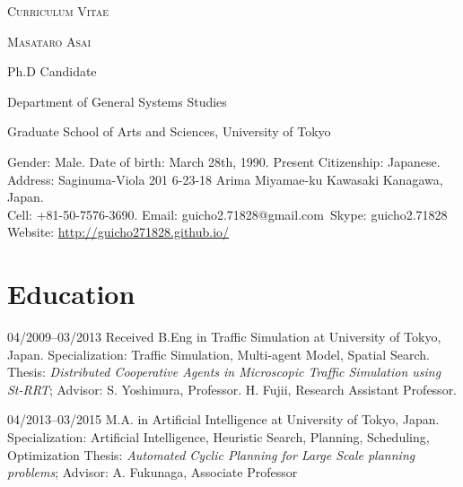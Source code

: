 \documentclass[letterpaper]{article}
\begin{document}
\pagestyle{empty}

\begin{center}
\huge{\textsc{Curriculum Vitae}}
\vspace{\baselineskip}

\Large{\textsc{Masataro Asai}}
\vspace{0.5\baselineskip}

\large{
Ph.D Candidate

Department of General Systems Studies

Graduate School of Arts and Sciences, University of Tokyo
}

\vspace{0.8\baselineskip}

\normalsize{
 Gender: Male. Date of birth: March 28th, 1990. Present Citizenship: Japanese. \\
 Address: Saginuma-Viola 201 6-23-18 Arima Miyamae-ku Kawasaki Kanagawa, Japan. \\
 Cell: +81-50-7576-3690. Email: guicho2.71828@gmail.com\ Skype: guicho2.71828\\
 Website: \url{http://guicho271828.github.io/}}
\end{center}


\section{Education}

\begin{CV}
 \item[04/2009--03/2013] Received B.Eng in Traffic Simulation at University of Tokyo, Japan.
 Specialization: Traffic Simulation, Multi-agent Model, Spatial Search.
 {\small Thesis: \emph{Distributed Cooperative Agents in Microscopic
 Traffic Simulation using St-RRT}; Advisor: S. Yoshimura,
 Professor. H. Fujii, Research Assistant Professor.}

 \item[04/2013--03/2015] M.A. in Artificial Intelligence at University of Tokyo, Japan.
 Specialization: Artificial Intelligence, Heuristic Search, Planning, Scheduling, Optimization
 {\small Thesis: \emph{Automated Cyclic Planning for Large Scale planning problems};
 Advisor: A. Fukunaga, Associate Professor}
\end{CV}
\end{document}

